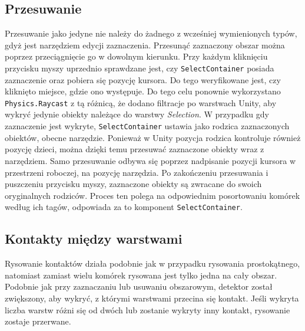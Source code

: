 \subsection{Przesuwanie}
\label{subsec:przesuwanie}

Przesuwanie jako jedyne nie należy do żadnego z wcześniej wymienionych typów,
gdyż jest narzędziem edycji zaznaczenia.
Przesunąć zaznaczony obszar można poprzez przeciągnięcie go w dowolnym kierunku.
Przy każdym kliknięciu przycisku myszy uprzednio sprawdzane jest,
czy \texttt{SelectContainer} posiada zaznaczenie oraz pobiera się pozycję kursora.
Do tego weryfikowane jest, czy kliknięto miejsce, gdzie ono występuje.
Do tego celu ponownie wykorzystano \texttt{Physics.Raycast} z tą różnicą,
że dodano filtracje po warstwach Unity, aby wykryć jedynie obiekty należące do warstwy \textit{Selection}.
W przypadku gdy zaznaczenie jest wykryte, \texttt{SelectContainer} ustawia jako rodzica zaznaczonych obiektów,
obecne narzędzie.
Ponieważ w Unity pozycja rodzica kontroluje również pozycję dzieci,
można dzięki temu przesuwać zaznaczone obiekty wraz z narzędziem.
Samo przesuwanie odbywa się poprzez nadpisanie pozycji kursora w przestrzeni roboczej, na pozycję narzędzia.
%
Po zakończeniu przesuwania i puszczeniu przycisku myszy,
zaznaczone obiekty są zwracane do swoich oryginalnych rodziców.
Proces ten polega na odpowiednim posortowaniu komórek według ich tagów, 
odpowiada za to komponent \texttt{SelectContainer}.

\subsection{Kontakty między warstwami}
\label{subsec:kontakty}

Rysowanie kontaktów działa podobnie jak w przypadku rysowania prostokątnego,
natomiast zamiast wielu komórek rysowana jest tylko jedna na cały obszar.
Podobnie jak przy zaznaczaniu lub usuwaniu obszarowym,
detektor został zwiększony, aby wykryć,
z którymi warstwami przecina się kontakt.
Jeśli wykryta liczba warstw różni się od dwóch lub zostanie wykryty inny kontakt,
rysowanie zostaje przerwane.

